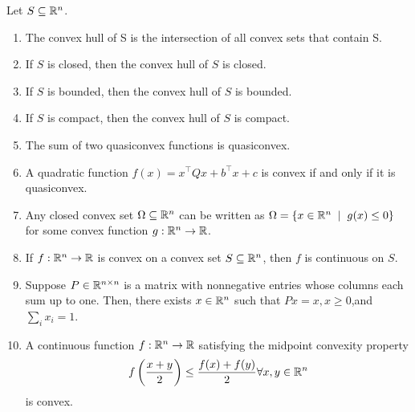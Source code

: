 \pb
Let $S\subseteq\mathbb{R}^{n}$.
\begin{enumerate}[leftmargin=*]
\item The convex hull of S is the intersection of all convex sets that contain S.
\item If $S$ is closed, then the convex hull of $S$ is closed.
\item If $S$ is bounded, then the convex hull of $S$ is bounded.
\item If $S$ is compact, then the convex hull of $S$ is compact.
\item The sum of two quasiconvex functions is quasiconvex.
\item A quadratic function $f(x) = x^{\top} Qx + b^{\top} x + c$ is convex if and only if it is quasiconvex.
\item Any closed convex set $\Omega\subseteq \mathbb{R}^{n}$ can be written as $\Omega=\set {x\in \R^{n}\st g(x)\le 0}$ for some convex function $g : \mathbb{R}^{n} \to \mathbb{R}$.
\item If $f : \mathbb{R}^{n} \to \mathbb{R}$ is convex on a convex set $S \subseteq \mathbb{R}^{n}$, then $f$ is continuous on $S$.
\item Suppose $P \in \mathbb{R}^{n\times n}$ is a matrix with nonnegative entries whose columns each sum up to one. Then, there exists $x\in \mathbb{R}^{n}$ such that $Px=x,x\ge0$,and $\sum_{i}x_{i}=1$.
\item A continuous function $f:\mathbb{R}^{n}\to\mathbb{R}$ satisfying the midpoint convexity property $$f\left(\frac{x+y}{2}\right) \leq \frac{f(x)+f(y)}{2}\forall x,y\in\mathbb{R}^{n}$$ is convex.
\end{enumerate}

\soln

